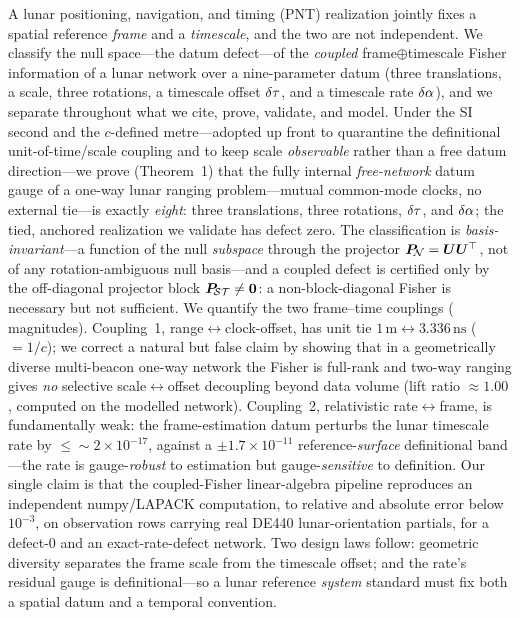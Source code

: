 A lunar positioning, navigation, and timing (PNT) realization jointly fixes a spatial
reference \emph{frame} and a \emph{timescale}, and the two are not independent. We
classify the null space---the datum defect---of the \emph{coupled} frame$\oplus$timescale
Fisher information of a lunar network over a nine-parameter datum (three translations, a
scale, three rotations, a timescale offset $\delta\tau$, and a timescale rate $\delta\alpha$), and
we separate throughout what we cite, prove, validate, and model. Under the SI second and
the $c$-defined metre---adopted up front to quarantine the definitional
unit-of-time/scale coupling and to keep scale \emph{observable} rather than a free datum
direction---we prove (Theorem~1) that the fully internal \emph{free-network} datum gauge of
a one-way lunar ranging problem---mutual common-mode clocks, no external tie---is exactly
\emph{eight}: three translations, three rotations, $\delta\tau$, and $\delta\alpha$; the tied,
anchored realization we validate has defect zero. The classification is \Proven{}
\emph{basis-invariant}---a function of the null \emph{subspace}
through the projector $\bm{P}_{\!\mathcal{N}}=\bm{U}\bm{U}^\top$, not of any rotation-ambiguous null
basis---and a coupled defect is certified only by the off-diagonal projector block
$\bm{P}_{\!\mathcal{S}\mathcal{T}}\neq\bm0$: a non-block-diagonal Fisher is necessary but not sufficient. We quantify
the two frame--time couplings (\Modelled{} magnitudes). Coupling~1,
range$\leftrightarrow$clock-offset, has unit tie
$1\,\mathrm{m}\leftrightarrow3.336\,\mathrm{ns}$ ($=1/c$); we correct a natural but false
claim by showing that in a geometrically diverse multi-beacon one-way network the Fisher
is full-rank and two-way ranging gives \emph{no} selective scale$\leftrightarrow$offset
decoupling beyond data volume (lift ratio $\approx1.00$, computed on the modelled network).
Coupling~2,
relativistic rate$\leftrightarrow$frame, is fundamentally weak: the frame-estimation datum
perturbs the lunar timescale rate by $\leq\!\sim\!2\times10^{-17}$, against a
$\pm1.7\times10^{-11}$ reference-\emph{surface} definitional band---the rate is
gauge-\emph{robust} to estimation but gauge-\emph{sensitive} to definition. Our single
\Validated{} claim is that the coupled-Fisher linear-algebra pipeline reproduces an
independent numpy/LAPACK computation, to relative and absolute error below $10^{-3}$, on
observation rows carrying real DE440 lunar-orientation partials, for a defect-$0$ and an
exact-rate-defect network. Two design laws follow: geometric diversity separates the
frame scale from the timescale offset; and the rate's residual gauge is definitional---so
a lunar reference \emph{system} standard must fix both a spatial datum and a temporal
convention.
